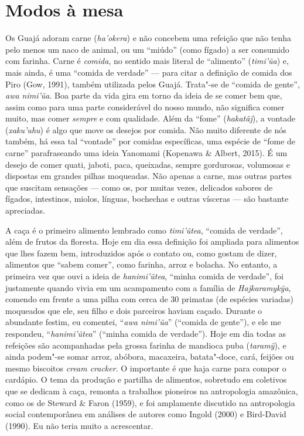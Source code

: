 \section{Modos à mesa}

Os Guajá adoram carne (\emph{ha'okera}) e não concebem uma refeição que
não tenha pelo menos um naco de animal, ou um ``miúdo'' (como fígado) a
ser consumido com farinha. Carne é \emph{comida}, no sentido mais
literal de ``alimento'' (\emph{timi'ũa}) e, mais ainda, é uma ``comida
de verdade'' --- para citar a definição de comida dos Piro (Gow, 1991),
também utilizada pelos Guajá. Trata"-se de ``comida de gente'', \emph{awa
nimi'ũa}. Boa parte da vida gira em torno da ideia de se comer bem que,
assim como para uma parte considerável do nosso mundo, não significa
comer muito, mas comer \emph{sempre} e com qualidade. Além da ``fome''
(\emph{hakatãj}), a vontade (\emph{xaku'uhu}) é algo que move os desejos
por comida. Não muito diferente de nós também, há essa tal ``vontade''
por comidas específicas, uma espécie de ``fome de carne'' parafraseando
uma ideia Yanomami (Kopenawa \& Albert, 2015). É um desejo de comer
quati, jaboti, paca, queixadas, sempre gordurosas, volumosas e dispostas
em grandes pilhas moqueadas. Não apenas a carne, mas outras partes que
suscitam sensações --- como os, por muitas vezes, delicados sabores de
fígados, intestinos, miolos, línguas, bochechas e outras vísceras --- são
bastante apreciadas.

A caça é o primeiro alimento lembrado como \emph{timi'ũtea}, ``comida de
verdade'', além de frutos da floresta. Hoje em dia essa definição foi
ampliada para alimentos que lhes fazem bem, introduzidos após o contato
ou, como gostam de dizer, alimentos que ``sabem comer'', como farinha,
arroz e bolacha. No entanto, a primeira vez que ouvi a ideia de
\emph{hanimi'ũtea}, ``minha comida de verdade'', foi justamente quando
vivia em um acampamento com a família de \emph{Hajkaramykỹa}, comendo em
frente a uma pilha com cerca de 30 primatas (de espécies variadas)
moqueados que ele, seu filho e dois parceiros haviam caçado. Durante o
abundante festim, eu comentei, ``\emph{awa nimi'ũa}'' (``comida de
gente''), e ele me respondeu, ``\emph{hanimi'ũtea}'' (``minha comida de
verdade''). Hoje em dia todas as refeições são acompanhadas pela grossa
farinha de mandioca puba (\emph{taramỹ}), e ainda podem"-se somar arroz,
abóbora, macaxeira, batata"-doce, cará, feijões ou mesmo biscoitos
\emph{cream cracker}. O importante é que haja carne para compor o
cardápio. O tema da produção e partilha de alimentos, sobretudo em
coletivos que se dedicam à caça, remonta a trabalhos pioneiros na
antropologia amazônica, como os de Steward \& Faron (1959), e foi
amplamente discutido na antropologia social contemporânea em análises de
autores como Ingold (2000) e Bird-David (1990). Eu não teria muito a
acrescentar.

